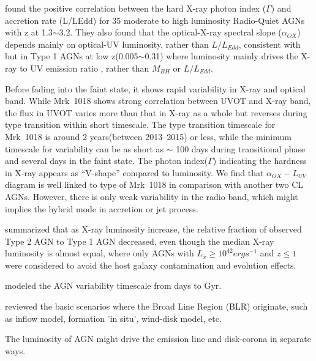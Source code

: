 \citet{2008ApJ...682...81S} found the positive correlation between the hard X-ray photon index ($\Gamma$) and accretion rate (L/LEdd) for 35 moderate to high luminosity Radio-Quiet AGNs with z at 1.3$\sim$3.2. They also found that the optical-X-ray spectral slope ($\alpha_{OX}$) depends mainly on optical-UV luminosity, rather than $L/L_{Edd}$, consistent with \citet{2012MNRAS.423..600S} but in Type 1 AGNs at low z(0.005$\sim$0.31) where luminosity mainly drives the X-ray to UV emission ratio , rather than $M_{BH}$ or $L/L_{Edd}$.







Before fading into the faint state, it shows rapid variability in X-ray and optical band. While Mrk~1018 shows strong correlation between UVOT and X-ray band, the flux in UVOT varies more than that in X-ray as a whole but reverses during type transition within short timescale. The type transition timescale for Mrk~1018 is around 2 years(between 2013--2015) or less, while the minimum timescale for variability can be as short as $\sim$ 100 days during transitional phase and several days in the faint state. The photon index($\Gamma$) indicating the hardness in X-ray appears as ``V-shape'' compared to luminosity. We find that $\alpha_{OX}-L_{UV}$ diagram is well linked to type of Mrk~1018 in comparison with another two CL AGNs. However, there is only weak variability in the radio band, which might implies the hybrid mode in accretion or jet process.



\citet{2017ApJ...841L..18M} summarized that as X-ray luminosity increase, the relative fraction of observed Type 2 AGN to Type 1 AGN decreased, even though the median X-ray luminosity is almost equal, where only AGNs with $L_x \geq 10^{42} erg s^{-1}$ and $z \leq 1$ were considered to avoid the host galaxy contamination and evolution effects.

\citet{2018MNRAS.476L..34S} modeled the AGN variability timescale from days to Gyr.

\citet{2019arXiv190800742C} reviewed the basic scenarios where the Broad Line Region (BLR) originate, such as inflow model, formation 'in situ', wind-disk model, etc. 


The luminosity of AGN might drive the emission line and disk-corona in separate ways.



